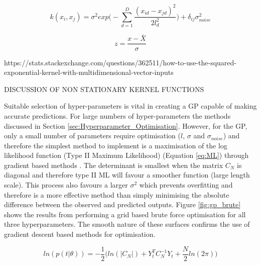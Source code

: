 \documentclass[a4paper, 10pt]{article}
\numberwithin{equation}{section}
\begin{document}
\begin{equation}
    \label{eq:kernel_seard}
    k(x_i,x_j)= \sigma^2exp \bigg(-\sum_{d=1}^D \frac{(x_{id}-x_{jd})^2}{2l_d^2} \bigg)+ \delta_{ij}\sigma_{noise}^2
\end{equation}




\begin{equation}
    \label{eq:standardise}
    z= \frac{x-\bar{X}}{\sigma}
\end{equation}

https://stats.stackexchange.com/questions/362511/how-to-use-the-squared-exponential-kernel-with-multidimensional-vector-inputs


DISCUSSION OF NON STATIONARY KERNEL FUNCTIONS


Suitable selection of hyper-parameters is vital in creating a GP capable of making accurate predictions. For large numbers of hyper-parameters the methods discussed in Section \ref{sec:Hyperparameter_Optimisation}. However, for the GP, only a small number of parameters require optimisation ($l$, $\sigma$ and $\sigma_{noise}$) and therefore the simplest method to implement is a maximisation of the log likelihood function (Type II Maximum Likelihood) (Equation \ref{eq:ML}) through gradient based methods \cite{Fletcher:1987:PMO:39857}. The determinant is smallest when the matrix $C_N$ is diagonal and therefore type II ML will favour a smoother function (large length scale). This process also favours a larger $\sigma^2$ which prevents overfitting and therefore is a more effective method than simply minimising the absolute difference between the observed and predicted outputs. Figure \ref{fig:gp_brute} shows the results from performing a grid based brute force optimisation for all three hyperparameters. The smooth nature of these surfaces confirms the use of gradient descent based methods for optimisation.   



\begin{equation}
    \label{eq:ML}
    ln (p(t|\theta)) = -\frac{1}{2} \bigg( ln(|C_N|) +Y_t^TC_N^{-1}Y_t + \frac{N}{2}ln(2\pi) \bigg) 
\end{equation}
\end{document}
